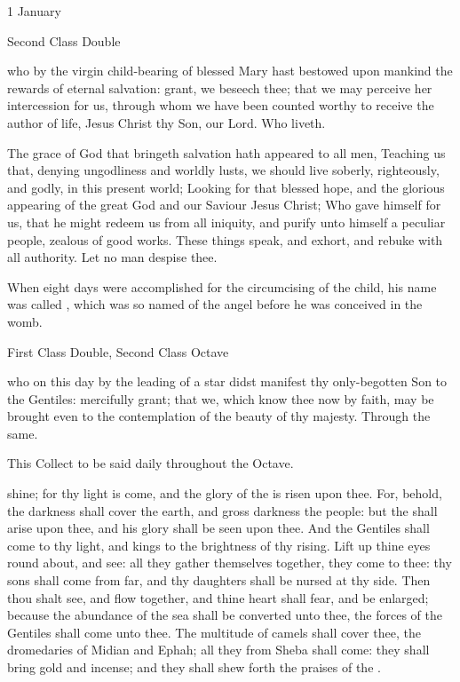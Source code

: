 \begin{inhead}
{1 January}\par
{Second Class Double}
\end{inhead}

\collect
{} who by the virgin child-bearing of blessed Mary hast bestowed upon mankind the rewards of eternal salvation: grant, we beseech thee; that we may perceive her intercession for us, through whom we have been counted worthy to receive the author of life, Jesus Christ thy Son, our Lord. Who liveth.

 The grace of God that bringeth salvation hath appeared to all men, Teaching us that, denying ungodliness and worldly lusts, we should live soberly, righteously, and godly, in this present world; Looking for that blessed hope, and the glorious appearing of the great God and our Saviour Jesus Christ; Who gave himself for us, that he might redeem us from all iniquity, and purify unto himself a peculiar people, zealous of good works. These things speak, and exhort, and rebuke with all authority. Let no man despise thee.

 When eight days were accomplished for the circumcising of the child, his name was called , which was so named of the angel before he was conceived in the womb.


\label{EpiphanyMass}
\begin{inhead}
{First Class Double, Second Class Octave}
\end{inhead}

\collect
{} who on this day by the leading of a star didst manifest thy only-begotten Son to the Gentiles: mercifully grant; that we, which know thee now by faith, may be brought even to the contemplation of the beauty of thy majesty. Through the same.
\begin{rubric}
    This Collect to be said daily throughout the Octave.
\end{rubric}

 shine; for thy light is come, and the glory of the  is risen upon thee. For, behold, the darkness shall cover the earth, and gross darkness the people: but the  shall arise upon thee, and his glory shall be seen upon thee. And the Gentiles shall come to thy light, and kings to the brightness of thy rising. Lift up thine eyes round about, and see: all they gather themselves together, they come to thee: thy sons shall come from far, and thy daughters shall be nursed at thy side. Then thou shalt see, and flow together, and thine heart shall fear, and be enlarged; because the abundance of the sea shall be converted unto thee, the forces of the Gentiles shall come unto thee. The multitude of camels shall cover thee, the dromedaries of Midian and Ephah; all they from Sheba shall come: they shall bring gold and incense; and they shall shew forth the praises of the .


